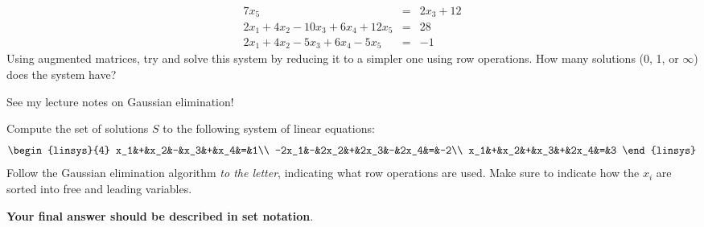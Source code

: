 \begin{eqnarray*}
7x_5&=&2x_3+12\\
2x_1+4x_2-10x_3+6x_4+12x_5&=&28\\
2x_1+4x_2-5x_3+6x_4-5x_5&=&-1
\end{eqnarray*}
Using augmented matrices, try and solve this system by reducing it to a simpler one using row operations. How many solutions (0, 1, or $\infty$) does the system have? 
\\
\begin{solution}
See my lecture notes on Gaussian elimination!
\end{solution}
\ii Compute the set of solutions $S$ to the following system of linear equations:
\[
\begin{linsys}{4}
x_1&+&x_2&-&x_3&+&x_4&=&1\\
-2x_1&-&2x_2&+&2x_3&-&2x_4&=&-2\\
x_1&+&x_2&+&x_3&+&2x_4&=&3
\end{linsys}
\]
Follow the Gaussian elimination algorithm {\em to the letter}, indicating what row operations are used. Make sure to indicate how the $x_i$ are sorted into free and leading variables. 

{\bf Your final answer should be described in set notation}. 

